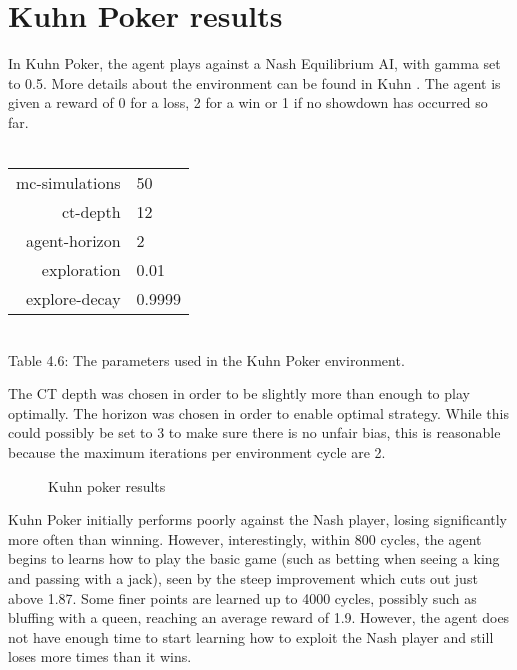 \documentclass[pdftex,twoside,a4paper]{report}
\begin{document}
\section{Kuhn Poker results}
In Kuhn Poker, the agent plays against a Nash Equilibrium AI, with gamma set to 0.5. More details about the environment can be found in Kuhn \cite{kuhn}. The agent is given a reward of 0 for a loss, 2 for a win or 1 if no showdown has occurred so far.\\\\
\begin{center}
\begin{tabular}{| r | l | }
\hline
mc-simulations & 50\\
ct-depth & 12\\
agent-horizon & 2\\
exploration & 0.01\\
explore-decay & 0.9999\\
\hline
\end{tabular}\\
\vspace{0.5mm}
Table 4.6: The parameters used in the Kuhn Poker environment.
\end{center}
The CT depth was chosen in order to be slightly more than enough to play optimally. The horizon was chosen in order to enable optimal strategy. While this could possibly be set to 3 to make sure there is no unfair bias, this is reasonable because the maximum iterations per environment cycle are 2.

\begin{figure}[h]
  \begin{center}
  \end{center}
  \caption{Kuhn poker results}
  \label{fig:kuhn_results}
\end{figure}

Kuhn Poker initially performs poorly against the Nash player, losing significantly more often than winning. However, interestingly, within 800 cycles, the agent begins to learns how to play the basic game (such as betting when seeing a king and passing with a jack), seen by the steep improvement which cuts out just above 1.87. Some finer points are learned up to 4000 cycles, possibly such as bluffing with a queen, reaching an average reward of 1.9. However, the agent does not have enough time to start learning how to exploit the Nash player and still loses more times than it wins.
\end{document}
